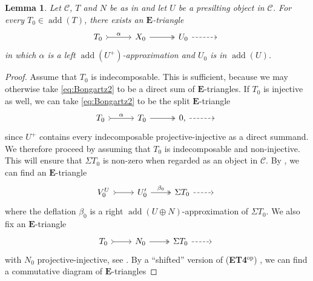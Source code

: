 \documentclass[10pt,twoside, a4paper,reqno]{amsart}
\DeclareMathOperator{\add}{add}
\newcommand{\calC}{\mathcal{C}}
\newcommand{\E}{\mathbf{E}}
\newtheorem{lemma}[theorem]{Lemma}
\theoremstyle{definition}
\begin{document}
\begin{lemma}\label{prop:Bongartz}
Let $\calC$, $T$ and $N$ be as in  and let $U$ be a presilting object in $\calC$.
	For every $T_0\in \add(T)$, there exists {an $\E$-triangle}
	 \begin{equation}\label{eq:Bongartz2}
    \begin{tikzcd}[ampersand replacement=\&,column sep=3em]
	T_0  \arrow[r,"\alpha" ,tail] \&  X_0 \arrow[r,two heads] \& U_0 \arrow[r,dashed] \& {}
    \end{tikzcd}
    \end{equation}
    in which $\alpha$ is a left $\add(U^+)$-approximation and $U_0$ is in $\add(U)$.
	\end{lemma}
		\begin{proof}
	Assume that $T_0$ is indecomposable. This is sufficient, because we may otherwise take \eqref{eq:Bongartz2} to be a direct sum of $\E$-triangles. If $T_0$ is injective as well, we can take \eqref{eq:Bongartz2} to be the split $\E$-triangle
    \begin{equation*}
    \begin{tikzcd}[ampersand replacement=\&,column sep=3em]
	T_0  \arrow[r,"\alpha" ,tail] \&  T_0 \arrow[r,two heads] \& 0, \arrow[r,dashed] \& {}
    \end{tikzcd}
    \end{equation*}
    since $U^+$ contains every indecomposable projective-injective as a direct summand. We therefore proceed by assuming that $T_0$ is indecomposable and non-injective. This will ensure that $\Sigma T_0$ is non-zero when regarded as an object in $\calC$. By , we can find an $\E$-triangle
    \begin{equation}\label{eq:Bongartz2dp}
    \begin{tikzcd}
	V^U_0 \arrow[r ,tail] & U'_0 \arrow[r,"\beta_0",two heads] & \Sigma T_0 \arrow[r,dashed] & {}
    \end{tikzcd}
    \end{equation}
    where the deflation $\beta_{0}$ is a right $\add(U\oplus N)$-approximation of $\Sigma T_0$. We also fix an $\E$-triangle
     \begin{equation}\label{eq:Bongartz2Sigma}
    \begin{tikzcd}
	T_0\arrow[r ,tail] & N_0 \arrow[r,two heads] & \Sigma T_0 \arrow[r,dashed] & {}
    \end{tikzcd}
    \end{equation}
    with $N_0$ projective-injective, see . By a ``shifted'' version of (\textbf{ET4}$^\text{op}$) \cite[Dual of Lem. A.10]{GNP23}, we can find a {commutative} diagram of $\E$-triangles

\end{proof}
\end{document}
